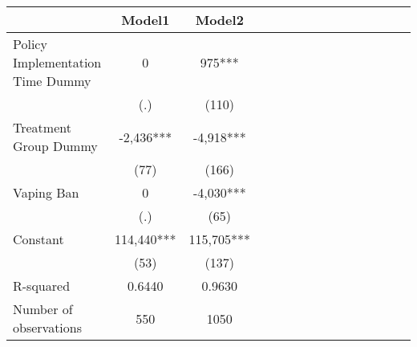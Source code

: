 \begin{tabular}{l*{14}{c}}
                    &      Model1   &      Model2   \\
\hline
Policy Implementation Time Dummy&           0   &         975***\\
                    &         (.)   &       (110)   \\
Treatment Group Dummy&      -2,436***&      -4,918***\\
                    &        (77)   &       (166)   \\
Vaping Ban          &           0   &      -4,030***\\
                    &         (.)   &        (65)   \\
Constant            &     114,440***&     115,705***\\
                    &        (53)   &       (137)   \\
\hline
R-squared           &      0.6440   &      0.9630   \\
Number of observations&         550   &        1050   \\
\end{tabular}

